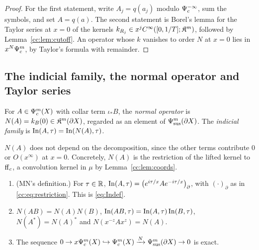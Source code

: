 \begin{proof}
For the first statement, write \(A_j=q(a_j)\) modulo
\(\Psi_{c}^{-\infty}\), sum the symbols, and set \(A=q(a)\). The second
statement is Borel's lemma for the Taylor series at \(x=0\) of the
kernels \(k_{R_j}\in x^jC^\infty([0,1/T];\mathfrak K^m)\), followed by
Lemma~\ref{cc:lem:cutoff}. An operator whose \(k\) vanishes to order
\(N\) at \(x=0\) lies in \(x^N\Psi_{c}^m\), by Taylor's formula with
remainder.
\end{proof}

\subsection{The indicial family, the normal operator and Taylor series}
\label{cc:subsec:indicial}

\begin{definition}\label{cc:def:normal}
For \(A\in\Psi_{c}^m(X)\) with collar term \(\iota_*B\), the \emph{normal
operator} is \(N(A)=k_B(0)\in\mathfrak K^m(\partial X)\), regarded as an element
of \(\Psi_{\mathrm{sus}}^m(\partial X)\). The \emph{indicial family} is
\(\operatorname{In}(A,\tau)=\operatorname{In}(N(A),\tau)\).
\end{definition}

\(N(A)\) does not depend on the decomposition, since the other terms
contribute \(0\) or \(O(x^\infty)\) at \(x=0\). Concretely, \(N(A)\) is the
restriction of the lifted kernel to \(\mathrm{ff}_c\), a convolution kernel in
\(\mu\) by Lemma~\ref{cc:lem:coords}.

\begin{proposition}
\label{cc:prop:indicial}
\begin{enumerate}
\item \textup{(MN's definition.)} For \(\tau\in\mathbb R\),
\(\operatorname{In}(A,\tau)=\bigl(e^{i\tau/x}Ae^{-i\tau/x}\bigr)_\partial\), with
\((\cdot)_\partial\) as in \eqref{cc:eq:restriction}. This is
\eqref{eq:Indef}.
\item \(N(AB)=N(A)N(B)\), \(\operatorname{In}(AB,\tau)=\operatorname{In}(A,\tau)\operatorname{In}(B,\tau)\),
\(N(A^*)=N(A)^*\) and \(N(x^{-z}Ax^z)=N(A)\).
\item The sequence
\(0\to x\Psi_{c}^m(X)\hookrightarrow\Psi_{c}^m(X)\xrightarrow{N}\Psi_{\mathrm{sus}}^m(\partial X)
\to0\) is exact.
\end{enumerate}
\end{proposition}

